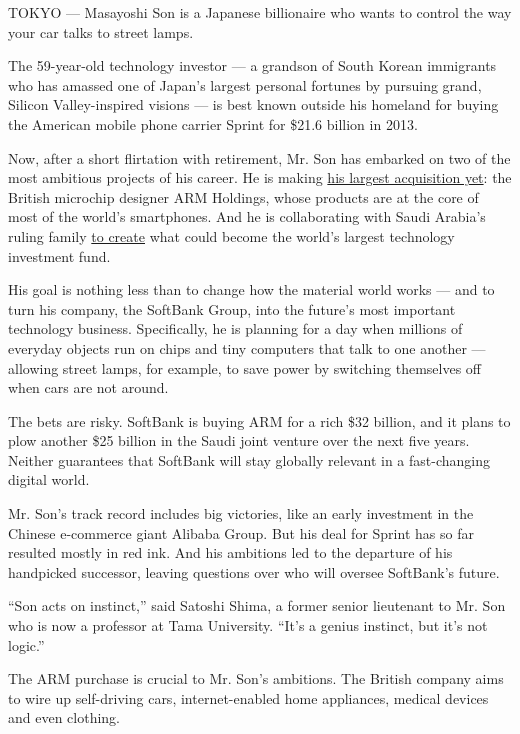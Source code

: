 TOKYO --- Masayoshi Son is a Japanese billionaire who wants to control
the way your car talks to street lamps.

The 59-year-old technology investor --- a grandson of South Korean
immigrants who has amassed one of Japan's largest personal fortunes by
pursuing grand, Silicon Valley-inspired visions --- is best known
outside his homeland for buying the American mobile phone carrier Sprint
for \$21.6 billion in 2013.

Now, after a short flirtation with retirement, Mr. Son has embarked on
two of the most ambitious projects of his career. He is making
\href{http://www.nytimes.com/2016/07/19/business/dealbook/softbank-buys-chip-designer-arm.html}{his
largest acquisition yet}: the British microchip designer ARM Holdings,
whose products are at the core of most of the world's smartphones. And
he is collaborating with Saudi Arabia's ruling family
\href{http://www.nytimes.com/2016/10/14/business/dealbook/softbank-and-saudi-arabia-partner-to-form-giant-investment-fund.html?_r=0}{to
create} what could become the world's largest technology investment
fund.

His goal is nothing less than to change how the material world works ---
and to turn his company, the SoftBank Group, into the future's most
important technology business. Specifically, he is planning for a day
when millions of everyday objects run on chips and tiny computers that
talk to one another --- allowing street lamps, for example, to save
power by switching themselves off when cars are not around.

The bets are risky. SoftBank is buying ARM for a rich \$32 billion, and
it plans to plow another \$25 billion in the Saudi joint venture over
the next five years. Neither guarantees that SoftBank will stay globally
relevant in a fast-changing digital world.

Mr. Son's track record includes big victories, like an early investment
in the Chinese e-commerce giant Alibaba Group. But his deal for Sprint
has so far resulted mostly in red ink. And his ambitions led to the
departure of his handpicked successor, leaving questions over who will
oversee SoftBank's future.

``Son acts on instinct,'' said Satoshi Shima, a former senior lieutenant
to Mr. Son who is now a professor at Tama University. ``It's a genius
instinct, but it's not logic.''

The ARM purchase is crucial to Mr. Son's ambitions. The British company
aims to wire up self-driving cars, internet-enabled home appliances,
medical devices and even clothing.

